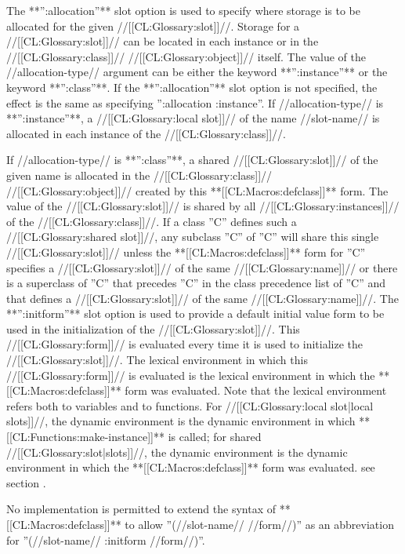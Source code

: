\itemitem{\bull} The **'':allocation''** slot option is used to specify where storage is to be allocated for the given //[[CL:Glossary:slot]]//. Storage for a //[[CL:Glossary:slot]]// can be located in each instance or in the //[[CL:Glossary:class]]// //[[CL:Glossary:object]]// itself. The value of the //allocation-type// argument can be either the keyword **'':instance''** or the keyword **'':class''**. If the **'':allocation''** slot option is not specified, the effect is the same as specifying '':allocation :instance''. \beginlist \itemitem{--} If //allocation-type// is **'':instance''**, a //[[CL:Glossary:local slot]]// of the name //slot-name// is allocated in each instance of the //[[CL:Glossary:class]]//.

\itemitem{--} If //allocation-type// is **'':class''**, a shared //[[CL:Glossary:slot]]// of the given name is allocated in the //[[CL:Glossary:class]]// //[[CL:Glossary:object]]// created by this **[[CL:Macros:defclass]]** form. The value of the //[[CL:Glossary:slot]]// is shared by all //[[CL:Glossary:instances]]// of the //[[CL:Glossary:class]]//. If a class ''C'' defines such a //[[CL:Glossary:shared slot]]//, any subclass ''C'' of ''C'' will share this single //[[CL:Glossary:slot]]// unless the **[[CL:Macros:defclass]]** form for ''C'' specifies a //[[CL:Glossary:slot]]// of the same //[[CL:Glossary:name]]// or there is a superclass of ''C'' that precedes ''C'' in the class precedence list of ''C'' and that defines a //[[CL:Glossary:slot]]// of the same //[[CL:Glossary:name]]//. \endlist \itemitem{\bull} The **'':initform''** slot option is used to provide a default initial value form to be used in the initialization of the //[[CL:Glossary:slot]]//. This //[[CL:Glossary:form]]// is evaluated every time it is used to initialize the //[[CL:Glossary:slot]]//. The lexical environment in which this //[[CL:Glossary:form]]// is evaluated is the lexical environment in which the **[[CL:Macros:defclass]]** form was evaluated. Note that the lexical environment refers both to variables and to functions. For //[[CL:Glossary:local slot|local slots]]//, the dynamic environment is the dynamic environment in which **[[CL:Functions:make-instance]]** is called; for shared //[[CL:Glossary:slot|slots]]//, the dynamic environment is the dynamic environment in which the **[[CL:Macros:defclass]]** form was evaluated. see section {\secref\ObjectCreationAndInit}.

No implementation is permitted to extend the syntax of **[[CL:Macros:defclass]]** to allow ''(//slot-name// //form//)'' as an abbreviation for ''(//slot-name// :initform //form//)''. 

